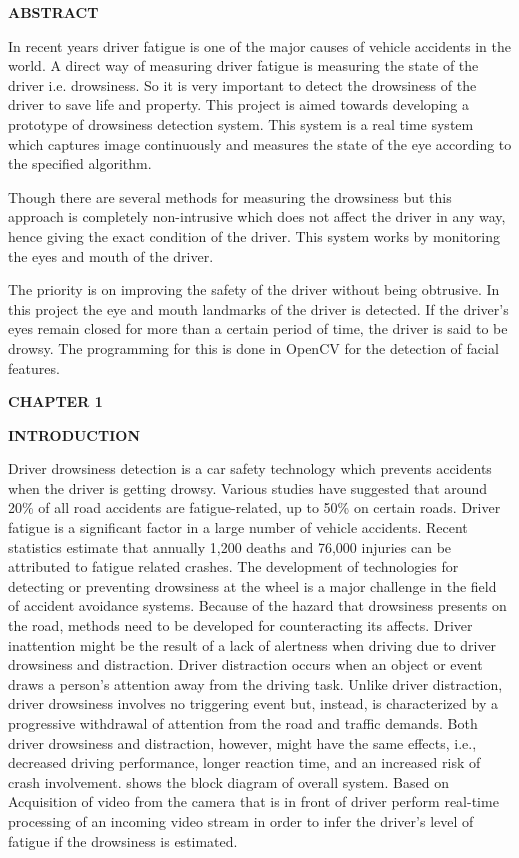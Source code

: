 \documentclass[a4paper,12pt]{article}
\begin{document}
\textbf{ABSTRACT}

In recent years driver fatigue is one of the major causes of vehicle
accidents in the world. A direct way of measuring driver fatigue is
measuring the state of the driver i.e. drowsiness. So it is very
important to detect the drowsiness of the driver to save life and
property. This project is aimed towards developing a prototype of
drowsiness detection system. This system is a real time system which
captures image continuously and measures the state of the eye according
to the specified algorithm.

Though there are several methods for measuring the drowsiness but this
approach is completely non-intrusive which does not affect the driver in
any way, hence giving the exact condition of the driver. This system
works by monitoring the eyes and mouth of the driver.

The priority is on improving the safety of the driver without being
obtrusive. In this project the eye and mouth landmarks of the driver is
detected. If the driver's eyes remain closed for more than a certain
period of time, the driver is said to be drowsy. The programming for
this is done in OpenCV for the detection of facial features.

\textbf{CHAPTER 1}

\textbf{INTRODUCTION}

Driver drowsiness detection is a car safety technology which prevents
accidents when the driver is getting drowsy. Various studies have
suggested that around 20\% of all road accidents are fatigue-related, up
to 50\% on certain roads. Driver fatigue is a significant factor in a
large number of vehicle accidents. Recent statistics estimate that
annually 1,200 deaths and 76,000 injuries can be attributed to fatigue
related crashes. The development of technologies for detecting or
preventing drowsiness at the wheel is a major challenge in the field of
accident avoidance systems. Because of the hazard that drowsiness
presents on the road, methods need to be developed for counteracting its
affects. Driver inattention might be the result of a lack of alertness
when driving due to driver drowsiness and distraction. Driver
distraction occurs when an object or event draws a person's attention
away from the driving task. Unlike driver distraction, driver drowsiness
involves no triggering event but, instead, is characterized by a
progressive withdrawal of attention from the road and traffic demands.
Both driver drowsiness and distraction, however, might have the same
effects, i.e., decreased driving performance, longer reaction time, and
an increased risk of crash involvement. shows the block diagram of
overall system. Based on Acquisition of video from the camera that is in
front of driver perform real-time processing of an incoming video stream
in order to infer the driver's level of fatigue if the drowsiness is
estimated.
\end{document}

